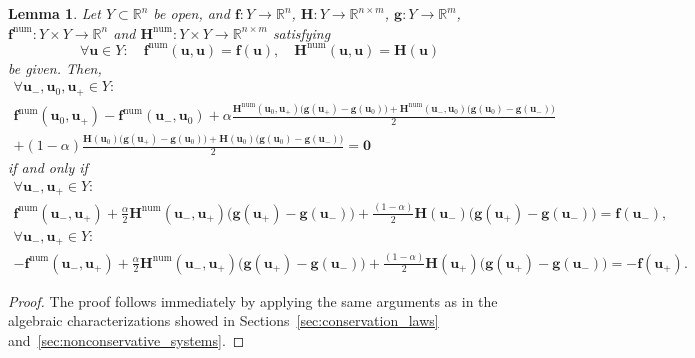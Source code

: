 \documentclass[]{scrartcl}
\renewcommand{\vec}[1]{\boldsymbol{#1}}
\newtheorem{lemma}[theorem]{Lemma}
\theoremstyle{definition}
\begin{document}
\begin{lemma}{\label{algebraic_wb}}
Let $Y \subset \mathbb{R}^n$ be open, and $\vec{f}\colon Y \to \mathbb{R}^n$,
$\vec{H}\colon Y \to \mathbb{R}^{n \times m}$, $\vec{g}\colon Y \to \mathbb{R}^m$,
$\vec{f}^{\mathrm{num}}\colon Y \times Y \to \mathbb{R}^{n}$ and
$\vec{H}^{\mathrm{num}}\colon Y \times Y \to \mathbb{R}^{n \times m}$ satisfying
\begin{equation}
\forall \vec{u} \in Y\colon \quad
\vec{f}^\mathrm{num}(\vec{u},\vec{u}) = \vec{f}(\vec{u}),
\quad
\vec{H}^{\mathrm{num}}(\vec{u},\vec{u}) = \vec{H}(\vec{u})
\end{equation}
be given. Then,
\begin{multline}
    \forall \vec{u}_-, \vec{u}_0, \vec{u}_+ \in Y\colon
    \\
    \vec{f}^{\mathrm{num}} (\vec{u}_0, \vec{u}_+)
    - \vec{f}^{\mathrm{num}}(\vec{u}_-, \vec{u}_0)
    + \alpha \frac{
        \vec{H}^{\mathrm{num}}(\vec{u}_0, \vec{u}_+) \bigl(\vec{g}(\vec{u}_+) - \vec{g}(\vec{u}_0)\bigr)
        + \vec{H}^{\mathrm{num}}(\vec{u}_-, \vec{u}_0) \bigl(\vec{g}(\vec{u}_0) - \vec{g}(\vec{u}_-)\bigr)
    }{2}\\
   + (1-\alpha) \frac{\vec{H}(\vec{u}_0)\bigl(\vec{g}(\vec{u}_+) - \vec{g}(\vec{u}_0)\bigr)
        + \vec{H}(\vec{u}_0) \bigl(\vec{g}(\vec{u}_0) - \vec{g}(\vec{u}_-)\bigr)
    }{2} = \vec{0}
    \label{algebraic_condition_wb}
\end{multline}
if and only if
\begin{multline}
    \forall \vec{u}_-, \vec{u}_+ \in Y\colon \\
    \vec{f}^{\mathrm{num}} (\vec{u}_-, \vec{u}_+)
    + \frac{\alpha}{2} \vec{H}^{\mathrm{num}}(\vec{u}_-, \vec{u}_+)
    \bigl(\vec{g}(\vec{u}_+) - \vec{g}(\vec{u}_-)\bigr) + \frac{(1-\alpha)}{2}\vec{H}(\vec{u}_-) \bigl( \vec{g}(\vec{u}_+) - \vec{g}(\vec{u}_-) \bigr )
    = \vec{f}(\vec{u}_-),
\end{multline}
\begin{multline}
    \forall \vec{u}_-, \vec{u}_+ \in Y\colon \\
    {-}\vec{f}^{\mathrm{num}} (\vec{u}_-, \vec{u}_+)
    + \frac{\alpha}{2}\vec{H}^{\mathrm{num}}(\vec{u}_-, \vec{u}_+)
    \bigl(\vec{g}(\vec{u}_+) - \vec{g}(\vec{u}_-)\bigr) + \frac{(1-\alpha)}{2}\vec{H}(\vec{u}_+) \bigl( \vec{g}(\vec{u}_+) - \vec{g}(\vec{u}_-) \bigr )
    = -\vec{f}(\vec{u}_+).
\end{multline}
\end{lemma}
\begin{proof}
The proof follows immediately by applying the same arguments as in the algebraic characterizations showed in Sections~\ref{sec:conservation_laws} and~\ref{sec:nonconservative_systems}.
\end{proof}
\end{document}
